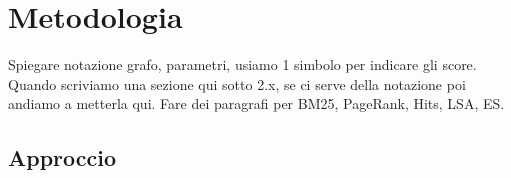 \section{Metodologia}
\label{sec:metodologia}

Spiegare notazione grafo, parametri, usiamo 1 simbolo per indicare gli score. Quando scriviamo una sezione qui sotto 2.x, se ci serve della notazione poi andiamo a metterla qui. 
Fare dei paragrafi per BM25, PageRank, Hits, LSA, ES.


\subsection{Approccio}
\label{sec:approccio}



